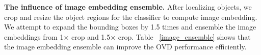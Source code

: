 \documentclass[sigconf]{acmart}
\begin{document}



\textbf{The influence of image embedding ensemble.} After localizing objects, we crop and resize the object regions for the  classifier to compute image embedding. 
We attempt to expand the bounding boxes by 1.5 times and ensemble the image embeddings from 1× crop and 1.5× crop. 
Table ~\ref{image_ensemble} shows that the image embedding ensemble can improve the OVD performance efficiently.






\subsubsection{}



\end{document}
